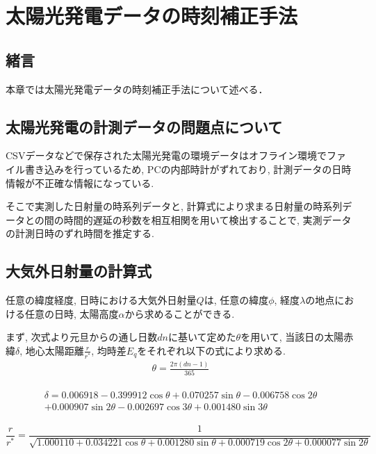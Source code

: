 
\chapter{太陽光発電データの時刻補正手法}
\label{chap:second}

\section{緒言}
本章では太陽光発電データの時刻補正手法について述べる．


\section{太陽光発電の計測データの問題点について}
CSVデータなどで保存された太陽光発電の環境データはオフライン環境でファイル書き込みを行っているため, PCの内部時計がずれており, 計測データの日時情報が不正確な情報になっている.

そこで実測した日射量の時系列データと, 計算式により求まる日射量の時系列データとの間の時間的遅延の秒数を相互相関を用いて検出することで, 実測データの計測日時のずれ時間を推定する.

\section{大気外日射量の計算式}
任意の緯度経度, 日時における大気外日射量$Q$は, 任意の緯度$\phi$, 経度$\lambda$の地点における任意の日時, 太陽高度$\alpha$から求めることができる.

まず, 次式より元旦からの通し日数$dn$に基いて定めた$\theta$を用いて, 当該日の太陽赤緯$\delta$, 地心太陽距離$\frac{r}{r^{*}}$, 均時差$E_q$をそれぞれ以下の式により求める.
\begin{eqnarray}
  \theta =  \frac{2\pi (dn-1)}{365}
\end{eqnarray}

\begin{eqnarray}
  \begin{split}
    \delta =  0.006918-0.399912\cos \theta+0.070257\sin \theta-0.006758\cos 2\theta\\
    +0.000907\sin 2\theta-0.002697\cos 3\theta+0.001480\sin 3\theta
  \end{split}
\end{eqnarray}

\begin{dmath}
  \frac{r}{r^{*}} =  \frac{1}{\sqrt{1.000110+0.034221\cos \theta+0.001280\sin \theta+0.000719\cos 2\theta+0.000077\sin 2\theta}}
\end{dmath}

